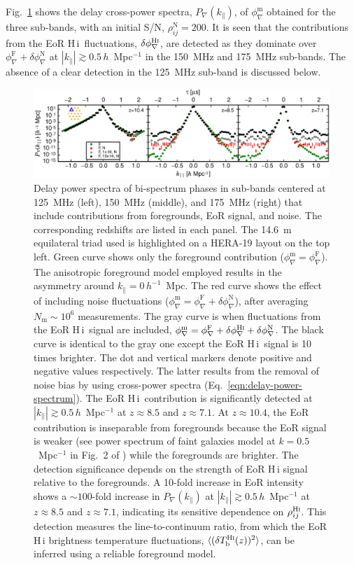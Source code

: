 \documentclass[
reprint,
superscriptaddress,
amsmath,
amssymb,
aps,
prd
]{revtex4-1}
\newcommand{\HI}{H\,{\sc i}}
\begin{document}
Fig.~\ref{fig:cpdps} shows the delay cross-power spectra, $P_\nabla(k_\parallel)$, of $\phi_\nabla^\textrm{m}$ obtained for the three sub-bands, with an initial S/N, $\rho_{ij}^\textrm{N}=200$. It is seen that the contributions from the EoR \HI\ fluctuations, $\delta\phi_\nabla^\textrm{H{\sc i}}$, are detected as they dominate over $\phi_\nabla^\textrm{F} + \delta\phi_\nabla^\textrm{N}$ at $|k_\parallel| \gtrsim 0.5\,h$~Mpc$^{-1}$ in the 150~MHz and 175~MHz sub-bands. The absence of a clear detection in the 125~MHz sub-band is discussed below.

\begin{figure}[htb]
  \includegraphics[width=\linewidth]{cpdps_all_subbands_SNR_200_nsamples_1048576}
\caption{Delay power spectra of bi-spectrum phases in sub-bands centered at 125~MHz (left), 150~MHz (middle), and 175~MHz (right) that include contributions from foregrounds, EoR signal, and noise. The corresponding redshifts are listed in each panel. The 14.6~m equilateral triad used is highlighted on a HERA-19 layout on the top left. Green curve shows only the foreground contribution ($\phi_\nabla^\textrm{m}=\phi_\nabla^\textrm{F}$). The anisotropic foreground model employed \cite{thy15a} results in the asymmetry around $k_\parallel=0\,h^{-1}$~Mpc. The red curve shows the effect of including noise fluctuations ($\phi_\nabla^\textrm{m}=\phi_\nabla^\textrm{F}+\delta\phi_\nabla^\textrm{N}$), after averaging $N_\textrm{m} \sim 10^6$ measurements. The gray curve is when fluctuations from the EoR \HI\ signal are included, $\phi_\nabla^\textrm{m}=\phi_\nabla^\textrm{F}+\delta\phi_\nabla^\textrm{H{\sc i}}+\delta\phi_\nabla^\textrm{N}$. The black curve is identical to the gray one except the EoR \HI\ signal is 10 times brighter. The dot and vertical markers denote positive and negative values respectively. The latter results from the removal of noise bias by using cross-power spectra (Eq.~\ref{eqn:delay-power-spectrum}). The EoR \HI\ contribution is significantly detected at $|k_\parallel| \gtrsim 0.5\,h$~Mpc$^{-1}$ at $z\approx 8.5$ and $z\approx 7.1$. At $z\approx 10.4$, the EoR contribution is inseparable from foregrounds because the EoR signal is weaker (see power spectrum of {\sc faint galaxies} model at $k=0.5$~Mpc$^{-1}$ in Fig.~2 of \cite{gre17b}) while the foregrounds are brighter. The detection significance depends on the strength of EoR H\,{\sc i} signal relative to the foregrounds. A 10-fold increase in EoR intensity shows a $\sim 100$-fold increase in $P_\nabla(k_\parallel)$ at $|k_\parallel| \gtrsim 0.5\,h$~Mpc$^{-1}$ at $z\approx 8.5$ and $z\approx 7.1$, indicating its sensitive dependence on $\rho_{ij}^\textrm{H{\sc i}}$. This detection measures the line-to-continuum ratio, from which the EoR H\,{\sc i} brightness temperature fluctuations, $\langle(\delta T_\textrm{b}^\textrm{H{\sc i}}(z))^2\rangle$, can be inferred using a reliable foreground model. \label{fig:cpdps}}

\end{figure}
\end{document}
